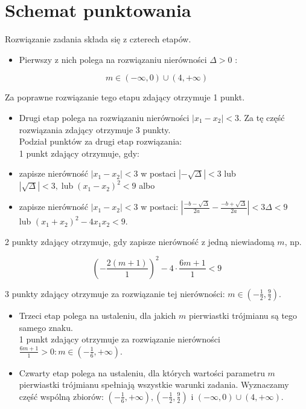 \documentclass[10pt]{article}
\begin{document}
\section*{Schemat punktowania}
Rozwiązanie zadania składa się z czterech etapów.

\begin{itemize}
  \item Pierwszy z nich polega na rozwiązaniu nierówności $\Delta>0$ :
\end{itemize}

$$
m \in(-\infty, 0) \cup(4,+\infty)
$$

Za poprawne rozwiązanie tego etapu zdający otrzymuje 1 punkt.

\begin{itemize}
  \item Drugi etap polega na rozwiązaniu nierówności $\left|x_{1}-x_{2}\right|<3$. Za tę część rozwiązania zdający otrzymuje 3 punkty.\\
Podział punktów za drugi etap rozwiązania:\\
1 punkt zdający otrzymuje, gdy:
  \item zapisze nierówność $\left|x_{1}-x_{2}\right|<3$ w postaci $|-\sqrt{\Delta}|<3$ lub $|\sqrt{\Delta}|<3, \operatorname{lub}\left(x_{1}-x_{2}\right)^{2}<9$ albo
  \item zapisze nierówność $\left|x_{1}-x_{2}\right|<3$ w postaci: $\left|\frac{-b-\sqrt{\Delta}}{2 a}-\frac{-b+\sqrt{\Delta}}{2 a}\right|<3 \Delta<9 \quad$ lub $\left(x_{1}+x_{2}\right)^{2}-4 x_{1} x_{2}<9$.
\end{itemize}

2 punkty zdający otrzymuje, gdy zapisze nierówność z jedną niewiadomą $m$, np.

$$
\left(-\frac{2(m+1)}{1}\right)^{2}-4 \cdot \frac{6 m+1}{1}<9
$$

3 punkty zdający otrzymuje za rozwiązanie tej nierówności: $m \in\left(-\frac{1}{2}, \frac{9}{2}\right)$.

\begin{itemize}
  \item Trzeci etap polega na ustaleniu, dla jakich $m$ pierwiastki trójmianu są tego samego znaku.\\
1 punkt zdający otrzymuje za rozwiązanie nierówności $\frac{6 m+1}{1}>0: m \in\left(-\frac{1}{6},+\infty\right)$.
  \item Czwarty etap polega na ustaleniu, dla których wartości parametru $m$ pierwiastki trójmianu spełniają wszystkie warunki zadania. Wyznaczamy część wspólną zbiorów: $\left(-\frac{1}{6},+\infty\right),\left(-\frac{1}{2}, \frac{9}{2}\right)$ i $(-\infty, 0) \cup(4,+\infty)$.
\end{itemize}
\end{document}
